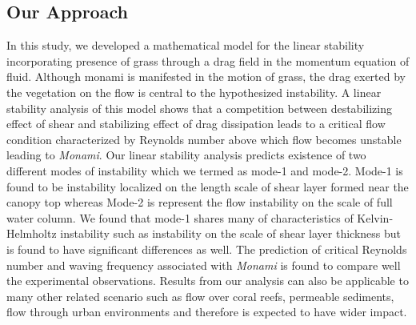 \documentclass[12pt]{report}   %
\begin{document}
\subsection{Our Approach}
In this study, we developed a mathematical model for the linear stability incorporating presence of grass through a drag field in the momentum equation of fluid. Although monami is manifested in the motion of grass, the drag exerted by the vegetation on the flow is central to the hypothesized instability. A linear stability analysis of this model shows that a competition between destabilizing effect of shear and stabilizing effect of drag dissipation leads to a critical flow condition characterized by Reynolds number above which flow becomes unstable leading to \textit{Monami}. Our linear stability analysis predicts existence of two different modes of instability which we termed as mode-1 and mode-2. Mode-1 is found to be instability localized on the length scale of shear layer formed near the canopy top whereas Mode-2 is represent the flow instability on the scale of full water column. We found that mode-1 shares many of characteristics of Kelvin-Helmholtz instability such as instability on the scale of 
shear layer thickness but is found to have significant differences as well. The prediction of critical Reynolds number and waving frequency associated with \textit{Monami} is found to compare well the experimental observations. Results from our analysis can also be applicable to many other related scenario such as flow over coral reefs, permeable sediments, flow through urban environments and therefore is expected to have wider impact. 

%
\clearpage{\pagestyle{empty}\cleardoublepage}
\end{document}
